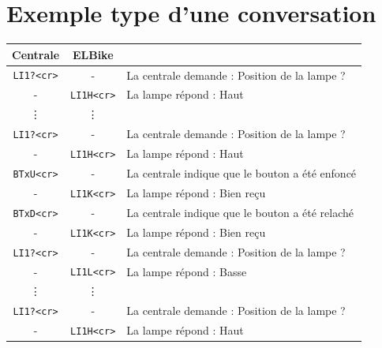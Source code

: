 \documentclass[a4paper, 10pt]{article} %
\newcommand{\rien}{-}
\begin{document}
\section{Exemple type d'une conversation}
\begin{center}
\begin{tabular}{|c|c|p{6cm}|}
\hline
Centrale&ELBike&\\
\hline
\hline
\verb|LI1?<cr>|&\rien& La centrale demande : Position de la lampe ?\\
\rien&\verb|LI1H<cr>|& La lampe répond : Haut\\
\hline
\vdots&\vdots& 	\\
\hline
\verb|LI1?<cr>|&\rien& La centrale demande : Position de la lampe ?\\
\rien&\verb|LI1H<cr>|& La lampe répond : Haut\\
\hline
\verb|BTxU<cr>|&\rien& La centrale indique que le bouton a été enfoncé\\
\rien&\verb|LI1K<cr>|& La lampe répond : Bien reçu\\
\hline
\verb|BTxD<cr>|&\rien& La centrale indique que le bouton a été relaché\\
\rien&\verb|LI1K<cr>|& La lampe répond : Bien reçu\\
\hline
\verb|LI1?<cr>|&\rien& La centrale demande : Position de la lampe ?\\
\rien&\verb|LI1L<cr>|& La lampe répond : Basse\\
\hline
\vdots&\vdots& 	\\
\hline
\verb|LI1?<cr>|&\rien& La centrale demande : Position de la lampe ?\\
\rien&\verb|LI1H<cr>|& La lampe répond : Haut\\
\hline
\end{tabular}
\end{center}
\end{document}

